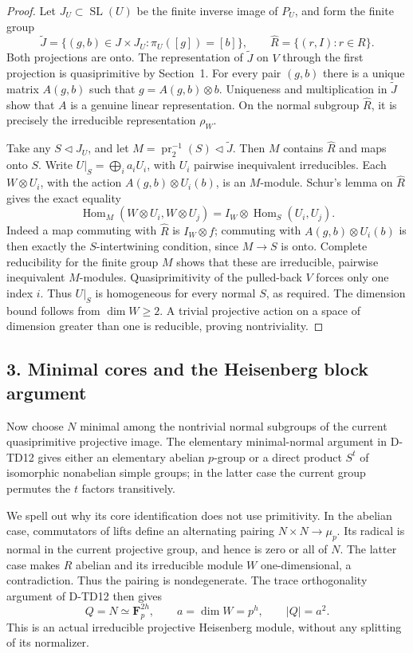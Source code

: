 \begin{proof}
Let \(J_U\subset\operatorname{SL}(U)\) be the finite inverse
image of \(P_U\), and form the finite group
\[
 \widetilde J
 =\{(g,b)\in J\times J_U:\pi_U([g])=[b]\},
 \qquad
 \widehat R=\{(r,I):r\in R\}.
 \tag{QPX.3}
\]
Both projections are onto. The representation of
\(\widetilde J\) on \(V\) through the first projection is
quasiprimitive by Section~1. For every pair \((g,b)\) there
is a unique matrix \(A(g,b)\) such that
\(g=A(g,b)\otimes b\). Uniqueness and multiplication in
\(\widetilde J\) show that \(A\) is a genuine linear
representation. On the normal subgroup \(\widehat R\), it
is precisely the irreducible representation \(\rho_W\).

Take any \(S\triangleleft J_U\), and let
\(M=\operatorname{pr}_2^{-1}(S)\triangleleft\widetilde J\).
Then \(M\) contains \(\widehat R\) and maps onto \(S\).
Write \(U|_S=\bigoplus_i a_i U_i\), with \(U_i\) pairwise
inequivalent irreducibles. Each \(W\otimes U_i\), with the
action \(A(g,b)\otimes U_i(b)\), is an \(M\)-module.
Schur's lemma on \(\widehat R\) gives the exact equality
\[
 \operatorname{Hom}_M(W\otimes U_i,W\otimes U_j)
       =I_W\otimes\operatorname{Hom}_S(U_i,U_j).
 \tag{QPX.4}
\]
Indeed a map commuting with \(\widehat R\) is \(I_W\otimes f\);
commuting with \(A(g,b)\otimes U_i(b)\) is then exactly the
\(S\)-intertwining condition, since \(M\to S\) is onto.
Complete reducibility for the finite group \(M\) shows that
these are irreducible, pairwise inequivalent \(M\)-modules.
Quasiprimitivity of the pulled-back \(V\) forces only one
index \(i\). Thus \(U|_S\) is homogeneous for every normal
\(S\), as required. The dimension bound follows from
\(\dim W\ge2\). A trivial projective action on a space of
dimension greater than one is reducible, proving nontriviality.
\end{proof}

\subsection*{3. Minimal cores and the Heisenberg block argument}

Now choose \(N\) minimal among the nontrivial normal subgroups
of the current quasiprimitive projective image. The elementary
minimal-normal argument in D-TD12 gives either an elementary
abelian \(p\)-group or a direct product \(S^t\) of isomorphic
nonabelian simple groups; in the latter case the current group
permutes the \(t\) factors transitively.

We spell out why its core identification does not use primitivity.
In the abelian case, commutators of lifts define an alternating
pairing \(N\times N\to\mu_p\). Its radical is normal in the
current projective group, and hence is zero or all of \(N\).
The latter case makes \(R\) abelian and its irreducible module
\(W\) one-dimensional, a contradiction. Thus the pairing is
nondegenerate. The trace orthogonality argument of D-TD12
then gives
\[
 Q=N\simeq\mathbf F_p^{2h},\qquad
 a=\dim W=p^h,\qquad |Q|=a^2.
 \tag{QPX.5}
\]
This is an actual irreducible projective Heisenberg module,
without any splitting of its normalizer.

